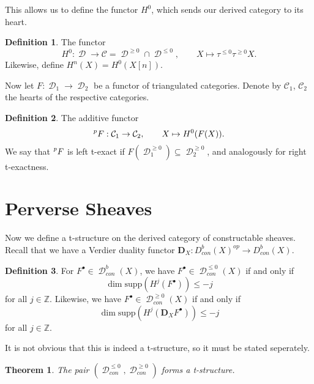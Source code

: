 \documentclass[letterpaper, 12pt]{article}
\newcommand{\Z}{\mathbb{Z}}
\DeclareMathOperator{\D}{\mathcal{D}}
\newtheorem{theorem}{Theorem}
\theoremstyle{definition}
\newtheorem{definition}{Definition}
\theoremstyle{remark}
\begin{document}
This allows us to define the functor $H^0$, which sends our derived category to its heart.
\begin{definition}
    The functor
    \begin{equation*}
        H^0: \D \to \mathcal{C} = \D^{\geq 0} \cap \D^{\leq 0}, \qquad
        X \mapsto \tau^{\leq 0} \tau^{\geq 0}X.
    \end{equation*}
    Likewise, define $H^n(X) = H^0(X[n])$.
\end{definition}
Now let $F: \D_1 \to \D_2$ be a functor of triangulated categories. Denote by $\mathcal{C}_1$, $\mathcal{C}_2$ the hearts of the respective categories.
\begin{definition}
    The additive functor
    \begin{equation*}
        \prescript{p}{}{F}: \mathcal{C}_1 \to \mathcal{C}_2,\qquad
        X \mapsto H^0(F(X)).
    \end{equation*}
    We say that $\prescript{p}{}{F}$ is left t-exact if $F(\D_1^{\geq 0}) \subseteq \D_2^{\geq 0}$, and analogously for right t-exactness.
\end{definition}

\section{Perverse Sheaves}

Now we define a t-structure on the derived category of constructable sheaves. Recall that we have a Verdier duality functor $\mathbf{D}_X: D^b_{con}(X)^{op} \to D^b_{con}(X)$.
\begin{definition}
    For $F^\bullet \in \D^b_{con}(X)$, we have $F^\bullet \in \D^{\leq 0}_{con}(X)$ if and only if 
    \[\dim \text{supp}( H^j(F^\bullet)) \leq -j\] for all $j \in \Z$. 
    Likewise, we have $F^\bullet \in \D^{\geq 0}_{con}(X)$ if and only if 
    \[\dim \text{supp}( H^j(\mathbf{D}_X F^\bullet)) \leq -j\] for all $j \in \Z$.
\end{definition}

It is not obvious that this is indeed a t-structure, so it must be stated seperately.
\begin{theorem}
    The pair $(\D_{con}^{\leq 0}, \D_{con}^{\geq 0})$ forms a t-structure. 
\end{theorem}
\end{document}
